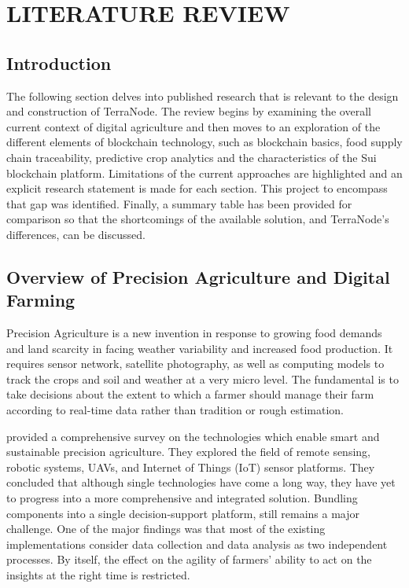 \chapter{LITERATURE REVIEW}

\section{Introduction}

The following section delves into published research that is relevant to the design and construction of TerraNode. The review begins by examining the overall current context of digital agriculture and then moves to an exploration of the different elements of blockchain technology, such as blockchain basics, food supply chain traceability, predictive crop analytics and the characteristics of the Sui blockchain platform. Limitations of the current approaches are highlighted and an explicit research statement is made for each section. This project to encompass that gap was identified. Finally, a summary table has been provided for comparison so that the shortcomings of the available solution, and TerraNode's differences, can be discussed.

\section{Overview of Precision Agriculture and Digital Farming}

Precision Agriculture is a new invention in response to growing food demands and land scarcity in facing weather variability and increased food production. It requires sensor network, satellite photography, as well as computing models to track the crops and soil and weather at a very micro level. The fundamental is to take decisions about the extent to which a farmer should manage their farm according to real-time data rather than tradition or rough estimation.

\textcite{padhiary2025emerging} provided a comprehensive survey on the technologies which enable smart and sustainable precision agriculture. They explored the field of remote sensing, robotic systems, UAVs, and Internet of Things (IoT) sensor platforms. They concluded that although single technologies have come a long way, they have yet to progress into a more comprehensive and integrated solution. Bundling components into a single decision-support platform, still remains a major challenge. One of the major findings was that most of the existing implementations consider data collection and data analysis as two independent processes. By itself, the effect on the agility of farmers' ability to act on the insights at the right time is restricted.

